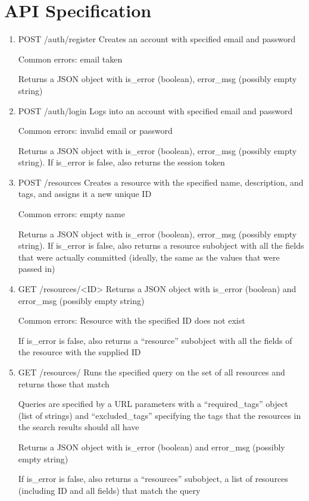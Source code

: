 \documentclass[12pt]{article}
\begin{document}
\section{API Specification}
\label{appendix:apispec}
\begin{enumerate}
\item POST /auth/register
Creates an account with specified email and password

Common errors: email taken

Returns a JSON object with is\_error (boolean), error\_msg (possibly empty string)

\item POST /auth/login
Logs into an account with specified email and password

Common errors: invalid email or password

Returns a JSON object with is\_error (boolean), error\_msg (possibly empty string). If is\_error is false, also returns the session token


\item POST /resources
Creates a resource with the specified name, description, and tags, and assigns it a new unique ID

Common errors: empty name

Returns a JSON object with is\_error (boolean), error\_msg (possibly empty string). If is\_error is false, also returns a resource subobject with all the fields that were actually committed (ideally, the same as the values that were passed in)

\item GET /resources/<ID>
Returns a JSON object with is\_error (boolean) and error\_msg (possibly empty string)

Common errors: Resource with the specified ID does not exist

If is\_error is false, also returns a ``resource'' subobject with all the fields of the resource with the supplied ID

\item GET /resources/
Runs the specified query on the set of all resources and returns those that match

Queries are specified by a URL parameters with a ``required\_tags'' object (list of strings) and ``excluded\_tags'' specifying the tags that the resources in the search results should all have

Returns a JSON object with is\_error (boolean) and error\_msg (possibly empty string)

If is\_error is false, also returns a ``resources'' subobject, a list of resources (including ID and all fields) that match the query


\end{enumerate}
\end{document}
